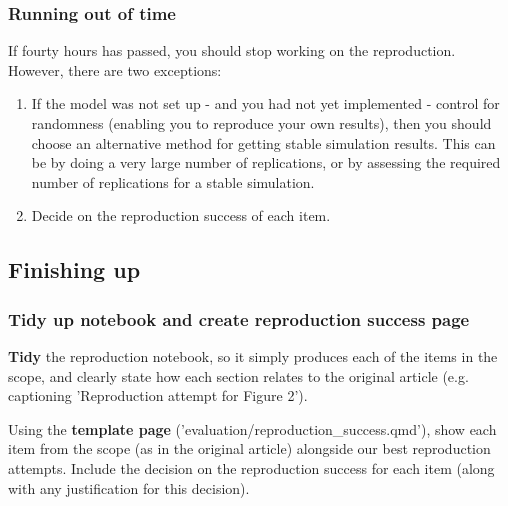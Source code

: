\vspace{0.5cm}
\subsubsection{Running out of time}

If fourty hours has passed, you should stop working on the reproduction. However, there are two exceptions:
\begin{enumerate}
    \item If the model was not set up - and you had not yet implemented - control for randomness (enabling you to reproduce your own results), then you should choose an alternative method for getting stable simulation results. This can be by doing a very large number of replications, or by assessing the required number of replications for a stable simulation.
    \item Decide on the reproduction success of each item.
\end{enumerate}

\vspace{0.5cm}
\subsection{Finishing up}

\subsubsection{Tidy up notebook and create reproduction success page}

\textbf{Tidy} the reproduction notebook, so it simply produces each of the items in the scope, and clearly state how each section relates to the original article (e.g. captioning 'Reproduction attempt for Figure 2').

Using the \textbf{template page} ('evaluation/reproduction\_success.qmd'), show each item from the scope (as in the original article) alongside our best reproduction attempts. Include the decision on the reproduction success for each item (along with any justification for this decision).